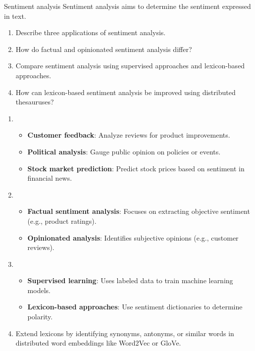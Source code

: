 \documentclass{article}
\begin{document}
\begin{exercise}{Sentiment analysis}\label{ex:sent-analysis}
  Sentiment analysis aims to determine the sentiment expressed in text.
  \begin{enumerate}
    \item Describe three applications of sentiment analysis.
    \item How do factual and opinionated sentiment analysis differ?
    \item Compare sentiment analysis using supervised approaches and lexicon-based approaches.
    \item How can lexicon-based sentiment analysis be improved using distributed thesauruses?
  \end{enumerate}

  \begin{solution}
    \begin{enumerate}
        \item \begin{itemize}
            \item \textbf{Customer feedback}: Analyze reviews for product improvements.
            \item \textbf{Political analysis}: Gauge public opinion on policies or events.
            \item \textbf{Stock market prediction}: Predict stock prices based on sentiment in financial news.
          \end{itemize}
        \item \begin{itemize}
            \item \textbf{Factual sentiment analysis}: Focuses on extracting objective sentiment (e.g., product ratings).
            \item \textbf{Opinionated analysis}: Identifies subjective opinions (e.g., customer reviews).
          \end{itemize}
        \item \begin{itemize}
            \item \textbf{Supervised learning}: Uses labeled data to train machine learning models.
            \item \textbf{Lexicon-based approaches}: Use sentiment dictionaries to determine polarity.
          \end{itemize}
        \item Extend lexicons by identifying synonyms, antonyms, or similar words in distributed word embeddings like Word2Vec or GloVe.
      \end{enumerate}
  \end{solution}
\end{exercise}
\end{document}
